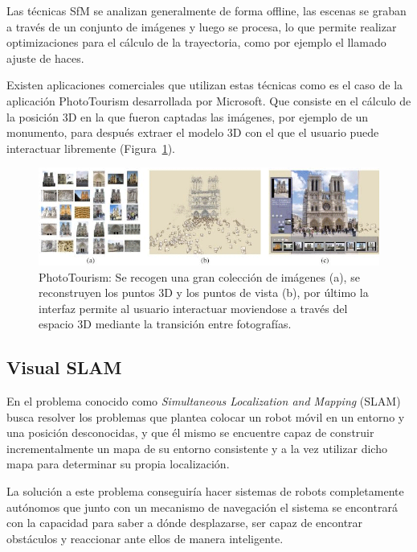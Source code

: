 Las técnicas SfM se analizan generalmente de forma offline, las escenas se graban a través de un conjunto de imágenes y luego se procesa, lo que permite realizar optimizaciones para el cálculo de la trayectoria, como por ejemplo el llamado ajuste de haces.

Existen aplicaciones comerciales que utilizan estas técnicas como es el caso de la aplicación PhotoTourism \parencite{Reference2} desarrollada por Microsoft. Que consiste en el cálculo de la posición 3D en la que fueron captadas las imágenes, por ejemplo de un monumento, para después extraer el modelo 3D con el que el usuario puede interactuar libremente (Figura~\ref{fig:Tourism}).

\begin{figure}[th]
\centering
\includegraphics[scale=0.57]{Figures/phototourism.png}
\decoRule
\caption[PhotoTourism]{PhotoTourism: Se recogen una gran colección de imágenes (a), se reconstruyen los puntos 3D y los puntos de vista (b), por último la interfaz permite al usuario interactuar moviendose a través del espacio 3D mediante la transición entre fotografías.}
\label{fig:Tourism}
\end{figure}

\subsection{Visual SLAM}

En el problema conocido como \textit{Simultaneous Localization and Mapping} (SLAM) busca resolver los problemas que plantea colocar un robot móvil en un entorno y una posición desconocidas, y que él mismo se encuentre capaz de construir incrementalmente un mapa de su entorno consistente y a la vez utilizar dicho mapa para determinar su propia localización.

La solución a este problema conseguiría hacer sistemas de robots completamente autónomos que junto con un mecanismo de navegación el sistema se encontrará con la capacidad para saber a dónde desplazarse, ser capaz de encontrar obstáculos y reaccionar ante ellos de manera inteligente.

